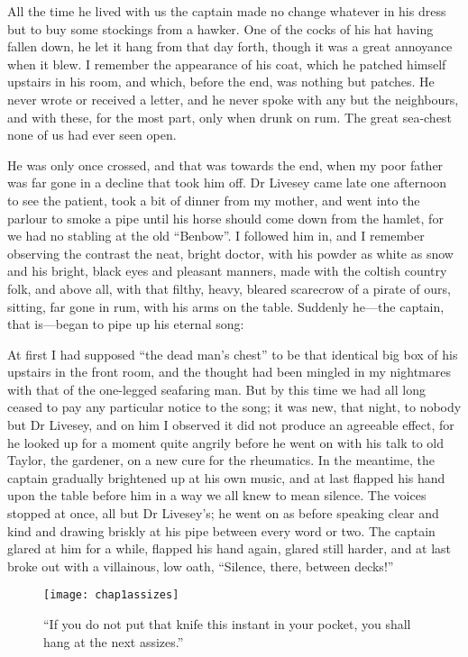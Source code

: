 All the time he lived with us the captain made no change what\-ever in his dress but to buy some stockings from a hawker. One of the cocks of his hat having fallen down, he let it hang from that day forth, though it was a great annoyance when it blew. I remember the appearance of his coat, which he patched himself upstairs in his room, and which, before the end, was nothing but patches. He never wrote or received a letter, and he never spoke with any but the neighbours, and with these, for the most part, only when drunk on rum. The great sea-chest none of us had ever seen open.

He was only once crossed, and that was towards the end, when my poor father was far gone in a decline that took him off. Dr Livesey came late one afternoon to see the patient, took a bit of dinner from my mother, and went into the parlour to smoke a pipe until his horse should come down from the hamlet, for we had no stabling at the old \enquote{Benbow}. I followed him in, and I remember observing the contrast the neat, bright doctor, with his powder as white as snow and his bright, black eyes and pleasant manners, made with the coltish country folk, and above all, with that filthy, heavy, bleared scarecrow of a pirate of ours, sitting, far gone in rum, with his arms on the table. Suddenly he---the captain, that is---began to pipe up his eternal song:

\longyoho

At first I had supposed \enquote{the dead man’s chest} to be that identical big box of his upstairs in the front room, and the thought had been mingled in my nightmares with that of the one-legged seafaring man. But by this time we had all long ceased to pay any particular notice to the song; it was new, that night, to nobody but Dr Livesey, and on him I observed it did not produce an agreeable effect, for he looked up for a moment quite angrily before he went on with his talk to old Taylor, the gardener, on a new cure for the rheumatics. In the meantime, the captain gradually brightened up at his own music, and at last flapped his hand upon the table before him in a way we all knew to mean silence. The voices stopped at once, all but Dr Livesey’s; he went on as before speaking clear and kind and drawing briskly at his pipe between every word or two. The captain glared at him for a while, flapped his hand again, glared still harder, and at last broke out with a villainous, low oath, \enquote{Silence, there, between decks!}

 \begin{figure}[p]
\centering
\texttt{[image: chap1assizes]}
\caption[\enquote{You shall hang at the next assizes.}]{\enquote{If you do not put that knife this instant in your pocket, you shall hang at the next assizes.}}
\end{figure}



